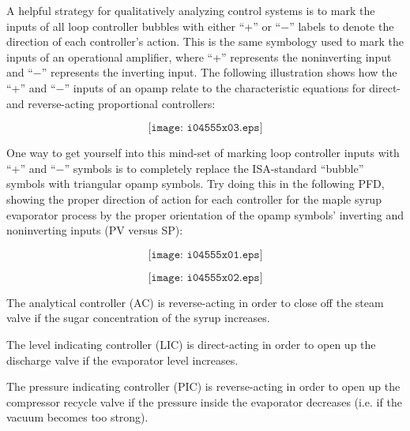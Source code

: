 

A helpful strategy for qualitatively analyzing control systems is to mark the inputs of all loop controller bubbles with either ``+'' or ``$-$'' labels to denote the direction of each controller's action.  This is the same symbology used to mark the inputs of an operational amplifier, where ``+'' represents the noninverting input and ``$-$'' represents the inverting input.  The following illustration shows how the ``+'' and ``$-$'' inputs of an opamp relate to the characteristic equations for direct- and reverse-acting proportional controllers:

$$\texttt{[image: i04555x03.eps]}$$

One way to get yourself into this mind-set of marking loop controller inputs with ``+'' and ``$-$'' symbols is to completely replace the ISA-standard ``bubble'' symbols with triangular opamp symbols.  Try doing this in the following PFD, showing the proper direction of action for each controller for the maple syrup evaporator process by the proper orientation of the opamp symbols' inverting and noninverting inputs (PV versus SP):

$$\texttt{[image: i04555x01.eps]}$$







$$\texttt{[image: i04555x02.eps]}$$

The analytical controller (AC) is reverse-acting in order to close off the steam valve if the sugar concentration of the syrup increases.

\vskip 10pt

The level indicating controller (LIC) is direct-acting in order to open up the discharge valve if the evaporator level increases.

\vskip 10pt

The pressure indicating controller (PIC) is reverse-acting in order to open up the compressor recycle valve if the pressure inside the evaporator decreases (i.e. if the vacuum becomes too strong).











